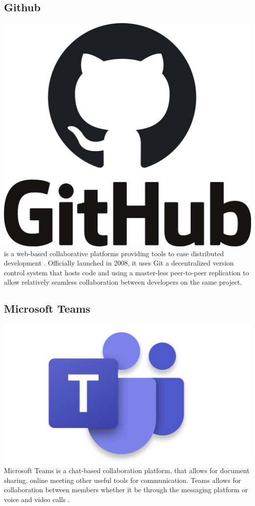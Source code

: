 \subsection{Github}\includegraphics[scale=0.025]{./img/Github.PNG}
 is a web-based collaborative platforms providing tools to ease distributed development \cite{7887704}. Officially launched in 2008, it uses Git a decentralized version control system that hosts code and using a master-less peer-to-peer replication to allow relatively seamless collaboration between developers on the same project.

\subsection{Microsoft Teams}
\includegraphics[scale=0.025]{./img/Teams.jpg}
Microsoft Teams is a chat-based collaboration platform, that allows for document sharing, online meeting other useful tools for communication.  Teams allows for collaboration between members whether it be through the messaging platform or voice and video calls \cite{teams}.

